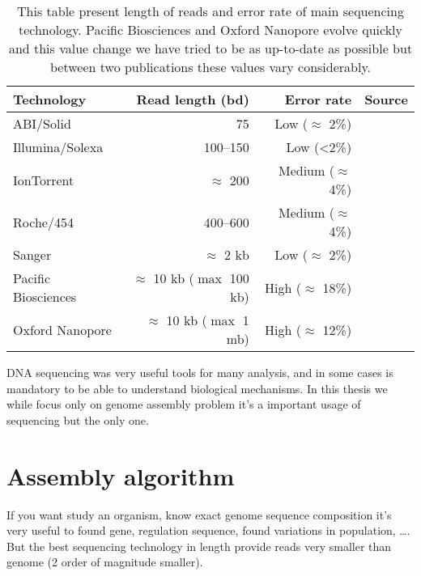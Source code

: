 \documentclass[main.tex]{subfiles}
\begin{document}
\begin{table}[ht]
    \centering
    \begin{tabular}{l|rr|l}
         Technology          & Read length (bd)                 & Error rate    & Source                          \\ \hline
         ABI/Solid           & 75                               & Low ($\approx$ 2\%)    & \cite{seq_assembly_demystified} \\
         Illumina/Solexa     & 100–150                          & Low (<2\%)             & \cite{seq_assembly_demystified} \\
         IonTorrent          & $\approx$ 200                    & Medium ($\approx$ 4\%) & \cite{seq_assembly_demystified} \\
         Roche/454           & 400–600                          & Medium ($\approx$ 4\%) & \cite{seq_assembly_demystified} \\
         Sanger              & $\approx$ 2 kb                   & Low ($\approx$ 2\%)    & \cite{seq_assembly_demystified} \\
         Pacific Biosciences & $\approx$ 10 kb ($\max$ 100 kb)  & High ($\approx$ 18\%)  & \cite{seq_assembly_demystified} \cite{longread_dark_matter} \\
         Oxford Nanopore     & $\approx$ 10 kb ($\max$ 1 mb)    & High ($\approx$ 12\%)  & \cite{longread_dark_matter} \cite{nanopore_read_accuracy} \\
    \end{tabular}
    \caption{This table present length of reads and error rate of main sequencing technology. Pacific Biosciences and Oxford Nanopore evolve quickly and this value change we have tried to be as up-to-date as possible but between two publications these values vary considerably.}
    \label{intro:tab:technology_property}
\end{table}


DNA sequencing was very useful tools for many analysis, and in some cases is mandatory to be able to understand biological mechanisms. In this thesis we while focus only on genome assembly problem it's a important usage of sequencing but the only one.

\section{Assembly algorithm}

If you want study an organism, know exact genome sequence composition it's very useful to found gene, regulation sequence, found variations in population, …. But the best sequencing technology in length provide reads very smaller than genome (2 order of magnitude smaller).
\end{document}
